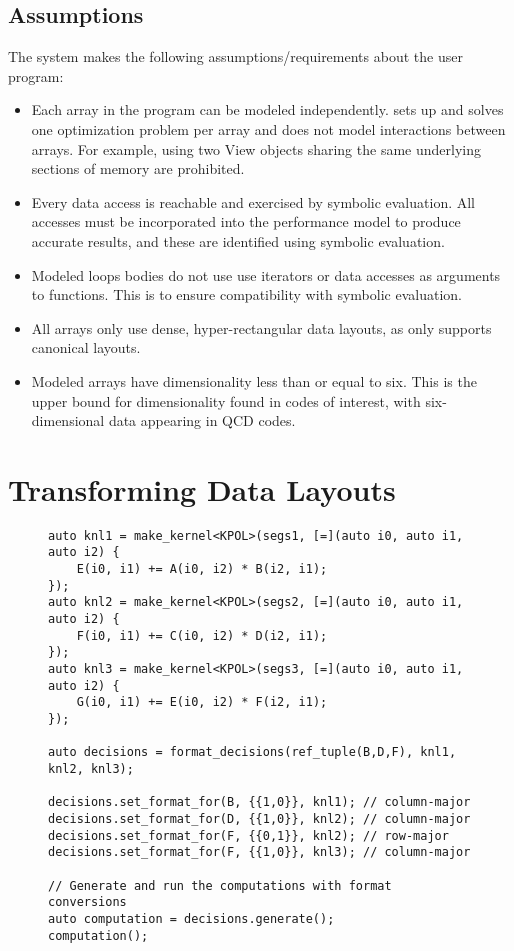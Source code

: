 \subsection{Assumptions}
The \FormatDecisions{} system makes the following assumptions/requirements about the user program:
\begin{itemize}
\item Each array in the program can be modeled independently. \FormatDecisions{} sets up and solves one optimization problem per array and does not model interactions between arrays. For example, using two View objects sharing the same underlying sections of memory are prohibited.
\item Every data access is reachable and exercised by symbolic evaluation. All accesses must be incorporated into the performance model to produce accurate results, and these are identified using symbolic evaluation.
\item Modeled loops bodies do not use use iterators or data accesses as arguments to functions. This is to ensure compatibility with symbolic evaluation.
\item All arrays only use dense, hyper-rectangular data layouts, as \FormatDecisions{} only supports canonical layouts.
\item Modeled arrays have dimensionality less than or equal to six. This is the upper bound for dimensionality found in codes of interest, with six-dimensional data appearing in QCD codes.
\end{itemize}


\section{Transforming Data Layouts}

\begin{figure}
\begin{lstlisting}[caption={Changing data layouts for three Views in the \textsc{3mm} benchmark using \FormatDecisions.},
	label={FormatDecisions3MM}]
auto knl1 = make_kernel<KPOL>(segs1, [=](auto i0, auto i1, auto i2) {
	E(i0, i1) += A(i0, i2) * B(i2, i1);
});
auto knl2 = make_kernel<KPOL>(segs2, [=](auto i0, auto i1, auto i2) {
	F(i0, i1) += C(i0, i2) * D(i2, i1);
});
auto knl3 = make_kernel<KPOL>(segs3, [=](auto i0, auto i1, auto i2) {
	G(i0, i1) += E(i0, i2) * F(i2, i1);
});

auto decisions = format_decisions(ref_tuple(B,D,F), knl1, knl2, knl3);

decisions.set_format_for(B, {{1,0}}, knl1); // column-major
decisions.set_format_for(D, {{1,0}}, knl2); // column-major
decisions.set_format_for(F, {{0,1}}, knl2); // row-major
decisions.set_format_for(F, {{1,0}}, knl3); // column-major

// Generate and run the computations with format conversions
auto computation = decisions.generate();
computation();
\end{lstlisting}
\end{figure}

